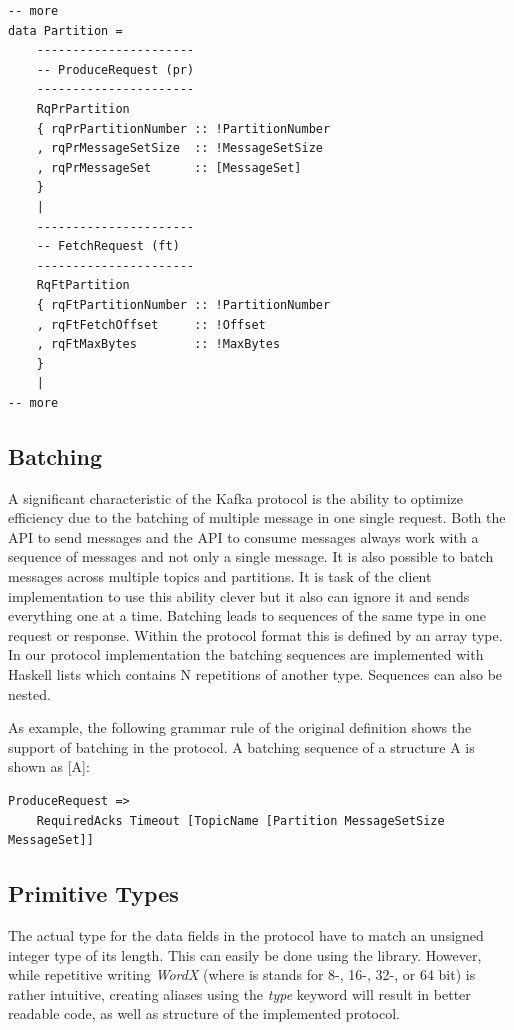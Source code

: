 \begin{lstlisting}
-- more
data Partition =
    ----------------------
    -- ProduceRequest (pr)
    ----------------------
    RqPrPartition
    { rqPrPartitionNumber :: !PartitionNumber
    , rqPrMessageSetSize  :: !MessageSetSize
    , rqPrMessageSet      :: [MessageSet]
    }
    |
    ----------------------
    -- FetchRequest (ft)
    ----------------------
    RqFtPartition
    { rqFtPartitionNumber :: !PartitionNumber
    , rqFtFetchOffset     :: !Offset
    , rqFtMaxBytes        :: !MaxBytes
    }
    |
-- more
\end{lstlisting}


\subsection{Batching}
\label{impl-prot-batching}
A significant characteristic of the Kafka protocol is the ability to optimize
efficiency due to the batching of multiple message in one single request. Both
the API to send messages and the API to consume messages always work with a
sequence of messages and not only a single message. It is also possible to batch
messages across multiple topics and partitions. It is task of the client
implementation to use this ability clever but it also can ignore it and sends everything
one at a time. Batching leads to sequences of the same type in one request or response. Within
the protocol format this is defined by an array type. In our protocol
implementation the batching sequences are implemented with Haskell lists which
contains N repetitions of another type. Sequences can also be nested. 

As example, the following grammar rule of the original definition shows the
support of batching in the protocol. A batching sequence of a structure A is
shown as [A]:
\begin{lstlisting}
ProduceRequest => 
    RequiredAcks Timeout [TopicName [Partition MessageSetSize MessageSet]]
\end{lstlisting}

\subsection{Primitive Types}
\label{subsec:protocol-types-primitive}

The actual type for the data fields in the protocol have to match an unsigned
integer type of its length. This can easily be done using the
library. However, while repetitive writing \textit{WordX} (where is stands for
8-, 16-, 32-, or 64 bit) is rather intuitive, creating aliases using the
\textit{type} keyword will result in better readable code, as well as structure
of the implemented protocol. 

